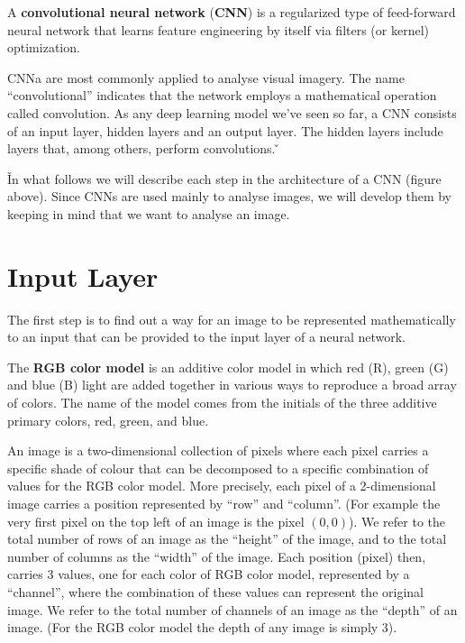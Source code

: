 A \textbf{convolutional neural network} (\textbf{CNN}) is a regularized type of feed-forward neural network that
learns feature engineering by itself via filters (or kernel) optimization.
\ed

CNNa are most commonly applied to analyse visual imagery. The name ``convolutional'' indicates that the network
employs a mathematical operation called convolution. As any deep learning model we've seen so far, a CNN consists of
an input layer, hidden layers and an output layer. The hidden layers include layers that, among others, perform
convolutions. \v


\v

In what follows we will describe each step in the architecture of a CNN (figure above). Since CNNs are used mainly to
analyse images, we will develop them by keeping in mind that we want to analyse an image.

\section{Input Layer}

The first step is to find out a way for an image to be represented mathematically to an input that can be provided to
the input layer of a neural network.

The \textbf{RGB color model} is an additive color model in which red (R), green (G) and blue (B) light are added 
together in various ways to reproduce a broad array of colors. The name of the model comes from the initials of the 
three additive primary colors, red, green, and blue. 
\ed

An image is a two-dimensional collection of pixels where each pixel carries a specific shade of colour that can be
decomposed to a specific combination of values for the RGB color model. More precisely, each pixel of a 2-dimensional
image carries a position represented by ``row'' and ``column''. (For example the very first pixel on the top left of
an image is the pixel $(0,0)$). We refer to the total number of rows of an image as the ``height'' of the image, and
to the total number of columns as the ``width'' of the image. Each position (pixel) then, carries 3 values, one for
each color of RGB color model, represented by a ``channel'', where the combination of these values can represent the
original image. We refer to the total number of channels of an image as the ``depth'' of an image. (For the RGB color
model the depth of any image is simply 3).

